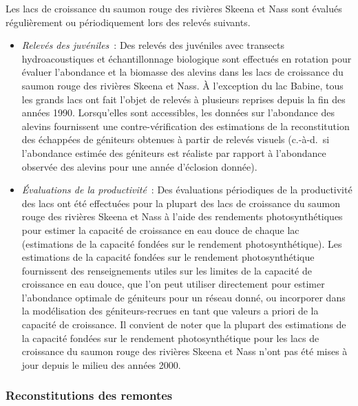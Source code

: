 \documentclass[french,11pt]{book}
\begin{document}
Les lacs de croissance du saumon rouge des rivières Skeena et Nass sont évalués régulièrement ou périodiquement lors des relevés suivants.
\begin{itemize}

\item
  \emph{Relevés des juvéniles}~: Des relevés des juvéniles avec transects hydroacoustiques et échantillonnage biologique sont effectués en rotation pour évaluer l'abondance et la biomasse des alevins dans les lacs de croissance du saumon rouge des rivières Skeena et Nass. À l'exception du lac Babine, tous les grands lacs ont fait l'objet de relevés à plusieurs reprises depuis la fin des années 1990. Lorsqu'elles sont accessibles, les données sur l'abondance des alevins fournissent une contre-vérification des estimations de la reconstitution des échappées de géniteurs obtenues à partir de relevés visuels (c.-à-d.~si l'abondance estimée des géniteurs est réaliste par rapport à l'abondance observée des alevins pour une année d'éclosion donnée).
\item
  \emph{Évaluations de la productivité}~: Des évaluations périodiques de la productivité des lacs ont été effectuées pour la plupart des lacs de croissance du saumon rouge des rivières Skeena et Nass à l'aide des rendements photosynthétiques pour estimer la capacité de croissance en eau douce de chaque lac (estimations de la capacité fondées sur le rendement photosynthétique). Les estimations de la capacité fondées sur le rendement photosynthétique fournissent des renseignements utiles sur les limites de la capacité de croissance en eau douce, que l'on peut utiliser directement pour estimer l'abondance optimale de géniteurs pour un réseau donné, ou incorporer dans la modélisation des géniteurs-recrues en tant que valeurs a priori de la capacité de croissance. Il convient de noter que la plupart des estimations de la capacité fondées sur le rendement photosynthétique pour les lacs de croissance du saumon rouge des rivières Skeena et Nass n'ont pas été mises à jour depuis le milieu des années 2000.
\end{itemize}
\subsubsection{Reconstitutions des remontes}\label{RunReconEst}
\end{document}
